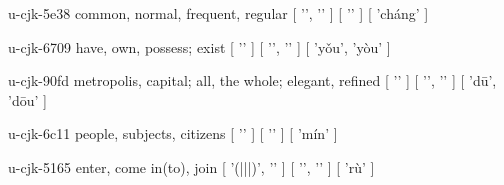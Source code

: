 \begin{multicols}{2}
\lettrine[lines=3]{\cjkgGlue{}}{}\begin{minipage}{0.8\linewidth} u-cjk-5e38  common, normal, frequent, regular  [ '\cjkgGlue{}', '\cjkgGlue{}' ]  [ '\cjkgGlue{}' ]  [ 'cháng' ] \end{minipage}

\lettrine[lines=3]{\cjkgGlue{}}{}\begin{minipage}{0.8\linewidth} u-cjk-6709  have, own, possess; exist  [ '\cjkgGlue{}' ]  [ '\cjkgGlue{}', '\cjkgGlue{}' ]  [ 'yǒu', 'yòu' ] \end{minipage}

\lettrine[lines=3]{\cjkgGlue{}}{}\begin{minipage}{0.8\linewidth} u-cjk-90fd  metropolis, capital; all, the whole; elegant, refined  [ '\cjkgGlue{}' ]  [ '\cjkgGlue{}', '\cjkgGlue{}' ]  [ 'dū', 'dōu' ] \end{minipage}

\lettrine[lines=3]{\cjkgGlue{}}{}\begin{minipage}{0.8\linewidth} u-cjk-6c11  people, subjects, citizens  [ '\cjkgGlue{}' ]  [ '\cjkgGlue{}' ]  [ 'mín' ] \end{minipage}

\lettrine[lines=3]{\cjkgGlue{}}{}\begin{minipage}{0.8\linewidth} u-cjk-5165  enter, come in(to), join  [ '\cjkgGlue{}(\cjkgGlue{}|\cjkgGlue{}|\cjkgGlue{}|\cjkgGlue{})', '\cjkgGlue{}' ]  [ '\cjkgGlue{}', '\cjkgGlue{}' ]  [ 'rù' ] \end{minipage}


\end{multicols}
